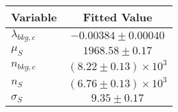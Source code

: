 \begin{tabular}[t]{lc}
\hline
Variable &Fitted Value\\
\hline\hline
$\lambda_{bkg,c}$&$-0.00384\pm0.00040$\\
\hline
$\mu_{S}$&$1968.58\pm0.17$\\
\hline
$n_{bkg,c}$&$(8.22\pm0.13)\times 10^3$\\
\hline
$n_{S}$&$(6.76\pm0.13)\times 10^3$\\
\hline
$\sigma_{S}$&$9.35\pm0.17$\\
\hline
\end{tabular}